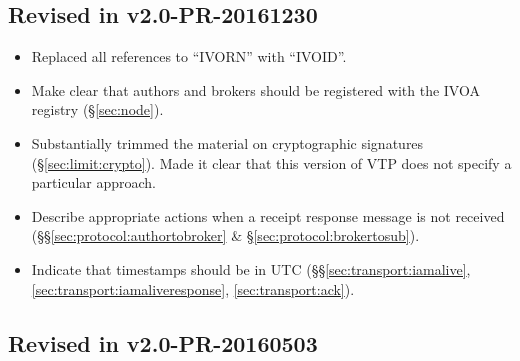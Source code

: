 \documentclass[a4paper,11pt]{ivoa}
\begin{document}
\subsection{Revised in v2.0-PR-20161230}

\begin{itemize}

    \item{Replaced all references to ``IVORN'' with ``IVOID''.}

    \item{Make clear that authors and brokers should be registered with the
    IVOA registry (\S\ref{sec:node}).}

    \item{Substantially trimmed the material on cryptographic signatures
    (\S\ref{sec:limit:crypto}). Made it clear that this version of VTP does
    not specify a particular approach.}

    \item{Describe appropriate actions when a receipt response message is not
    received (\S\S\ref{sec:protocol:authortobroker} \&
    \S\ref{sec:protocol:brokertosub}).}

    \item{Indicate that timestamps should be in UTC
    (\S\S\ref{sec:transport:iamalive}, \ref{sec:transport:iamaliveresponse},
    \ref{sec:transport:ack}).}

\end{itemize}

\subsection{Revised in v2.0-PR-20160503}
\end{document}
